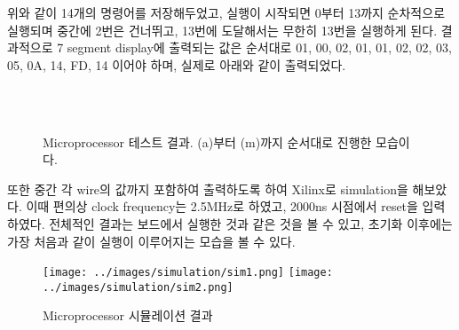 \documentclass[10pt]{article}
\begin{document}
    위와 같이 14개의 명령어를 저장해두었고, 실행이 시작되면 0부터 13까지 순차적으로 실행되며 중간에 2번은 건너뛰고, 13번에 도달해서는 무한히 13번을 실행하게 된다.
    결과적으로 7 segment display에 출력되는 값은 순서대로 01, 00, 02, 01, 01, 02, 02, 03, 05, 0A, 14, FD, 14 이어야 하며, 실제로 아래와 같이 출력되었다.
    \begin{figure}[H]
        \centering
         \hspace*{1mm}
         \hspace*{1mm}
         \hspace*{1mm}
         \\
         \hspace*{1mm}
         \hspace*{1mm}
         \hspace*{1mm}
         \\
         \hspace*{1mm}
         \hspace*{1mm}
         \hspace*{1mm}
         \hspace*{1mm}
         \hspace*{1mm}
        \caption{\small Microprocessor 테스트 결과. (a)부터 (m)까지 순서대로 진행한 모습이다.}
    \end{figure}

    또한 중간 각 wire의 값까지 포함하여 출력하도록 하여 Xilinx로 simulation을 해보았다. 
    이때 편의상 clock frequency는 2.5MHz로 하였고, 2000ns 시점에서 reset을 입력하였다.
    전체적인 결과는 보드에서 실행한 것과 같은 것을 볼 수 있고, 초기화 이후에는 가장 처음과 같이 실행이 이루어지는 모습을 볼 수 있다.
    
    \begin{figure}[H]
        \centering
        \texttt{[image: ../images/simulation/sim1.png]}
        \texttt{[image: ../images/simulation/sim2.png]}
        \caption{\small Microprocessor 시뮬레이션 결과}
    \end{figure}
\end{document}
